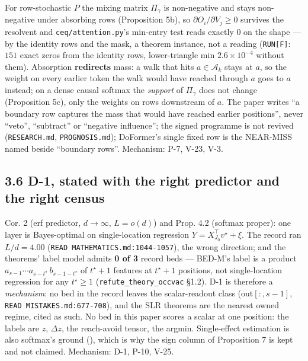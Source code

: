 \documentclass[11pt,a4paper]{article}
\theoremstyle{plain}
\theoremstyle{definition}
\theoremstyle{remark}
\begin{document}
For row-stochastic \(P\) the mixing matrix \(\Pi_\gamma\) is
non-negative and stays non-negative under absorbing rows (Proposition
5b), so \(\partial O_i/\partial V_j\ge0\) survives the resolvent and
\texttt{ceq/attention.py}'s min-entry test reads exactly \(0\) on the
shape --- by the identity rows and the mask, a theorem instance, not a
reading (\texttt{RUN{[}F{]}}: \(151\) exact zeros from the identity
rows, lower-triangle min \(2.6\times10^{-4}\) without them). Absorption
\textbf{redirects} mass: a walk that hits \(a\in\mathcal A_k\) stays at
\(a\), so the weight on every earlier token the walk would have reached
through \(a\) goes to \(a\) instead; on a dense causal softmax the
\emph{support} of \(\Pi_\gamma\) does not change (Proposition 5c), only
the weights on rows downstream of \(a\). The paper writes ``a boundary
row captures the mass that would have reached earlier positions'', never
``veto'', ``subtract'' or ``negative influence''; the signed programme
is not revived (\texttt{RESEARCH.md}, \texttt{PROGNOSIS.md}); DoFormer's
single fixed row is the NEAR-MISS named beside ``boundary rows''.
Mechanism: P-7, V-23, V-3.

\subsection{3.6 D-1, stated with the right predictor and the right
census}\label{d-1-stated-with-the-right-predictor-and-the-right-census}

\citep{marion-2025-single-location} Cor. 2 (erf predictor,
\(d\to\infty\), \(L=o(d)\)) and \citep{duranthon-2026-softmax-advantage}
Prop. 4.2 (softmax proper): one layer is Bayes-optimal on
single-location regression \(Y=X_{J_0}^\top v^\star+\xi\). The record
ran \(L/d=4.00\) (\texttt{READ\ MATHEMATICS.md:1044-1057}), the wrong
direction; and the theorems' label model admits \textbf{0 of 3} record
beds --- BED-M's label is a product
\(a_{s-1}\cdots a_{s-t^\star}\,b_{s-1-t^\star}\) of \(t^\star+1\)
features at \(t^\star+1\) positions, not single-location regression for
any \(t^\star\ge1\) (\texttt{refute\_theory\_occvac} §1.2). D-1 is
therefore a \emph{mechanism}: no bed in the record leaves the
scalar-readout class (\(\mathrm{out}[:,s-1]\),
\texttt{READ\ MISTAKES.md:677-708}), and the SLR theorems are the
nearest owned regime, cited as such. No bed in this paper scores a
scalar at one position: the labels are \(z\), \(\Delta z\), the
reach-avoid tensor, the argmin. Single-effect estimation is also
softmax's ground (\citep{zhang-2023-cina}), which is why the sign column
of Proposition 7 is kept and not claimed. Mechanism: D-1, P-10, V-25.
\end{document}
